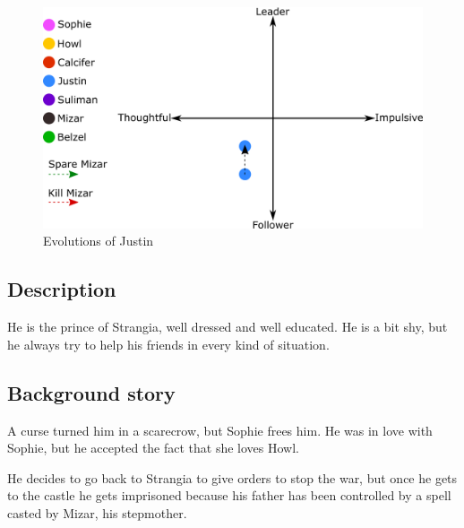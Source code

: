 \begin{figure}[H]
  \centering
   \includegraphics[width=14cm]{Images/Diagrams/Evolutions/justinEvolution}
  \caption{Evolutions of Justin}
\end{figure}

\subsection{Description}
He is the prince of Strangia, well dressed and well educated. He is a bit shy, but he always try to help his friends in every kind of situation.

\subsection{Background story}
A curse turned him in a scarecrow, but Sophie frees him. He was in love with Sophie, but he accepted the fact that she loves Howl.

He decides to go back to Strangia to give orders to stop the war, but once he gets to the castle he gets imprisoned because his father has been controlled by a spell casted by Mizar, his stepmother.
